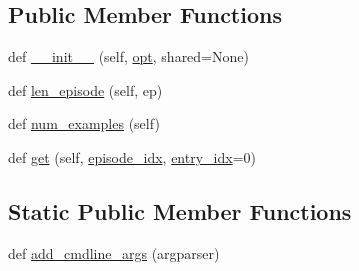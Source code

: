 \subsection*{Public Member Functions}
\begin{DoxyCompactItemize}
\item 
def \hyperlink{classparlai_1_1tasks_1_1wizard__of__wikipedia_1_1agents_1_1WizardDialogKnowledgeTeacher_a075ea712e50610abf78b8d976e0a460c}{\+\_\+\+\_\+init\+\_\+\+\_\+} (self, \hyperlink{classparlai_1_1tasks_1_1wizard__of__wikipedia_1_1agents_1_1WizardOfWikipediaTeacher_a5d97ef38a8c6e7df29724122f5b9ff72}{opt}, shared=None)
\item 
def \hyperlink{classparlai_1_1tasks_1_1wizard__of__wikipedia_1_1agents_1_1WizardDialogKnowledgeTeacher_adc1c3fa619c8bffd25986d41fb6f4136}{len\+\_\+episode} (self, ep)
\item 
def \hyperlink{classparlai_1_1tasks_1_1wizard__of__wikipedia_1_1agents_1_1WizardDialogKnowledgeTeacher_ad196e2551898f2a9e8d24414631a87bf}{num\+\_\+examples} (self)
\item 
def \hyperlink{classparlai_1_1tasks_1_1wizard__of__wikipedia_1_1agents_1_1WizardDialogKnowledgeTeacher_afb8212ad3cf99ccf6507eacef747f9d4}{get} (self, \hyperlink{classparlai_1_1core_1_1teachers_1_1FixedDialogTeacher_afd4ebab8063eb42d182d30a1a41f133e}{episode\+\_\+idx}, \hyperlink{classparlai_1_1core_1_1teachers_1_1FixedDialogTeacher_ae3201b15f3c3b46a2f3511bad9b43e7d}{entry\+\_\+idx}=0)
\end{DoxyCompactItemize}
\subsection*{Static Public Member Functions}
\begin{DoxyCompactItemize}
\item 
def \hyperlink{classparlai_1_1tasks_1_1wizard__of__wikipedia_1_1agents_1_1WizardDialogKnowledgeTeacher_a95d7be08460faf2e370a4008bf0324a4}{add\+\_\+cmdline\+\_\+args} (argparser)
\end{DoxyCompactItemize}
